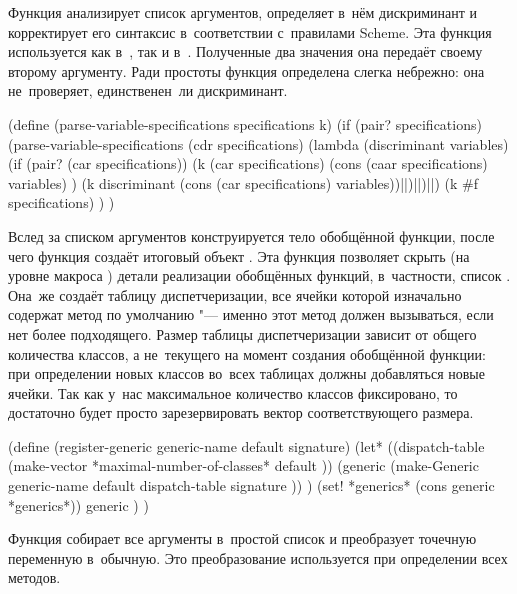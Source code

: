 Функция  анализирует список аргументов,
определяет в~нём дискриминант и корректирует его синтаксис в~соответствии
с~правилами Scheme. Эта функция используется как в~, так и
в~. Полученные два значения она передаёт своему второму
аргументу. Ради простоты функция  определена
слегка небрежно: она не~проверяет, единственен~ли дискриминант.

\begin{code:lisp}
(define (parse-variable-specifications specifications k)
  (if (pair? specifications)
      (parse-variable-specifications
       (cdr specifications)
       (lambda (discriminant variables)
         (if (pair? (car specifications))
             (k (car specifications)
                (cons (caar specifications) variables) )
             (k discriminant (cons (car specifications) variables))|\:|)|\:|)|\:|)
      (k #f specifications) ) )
\end{code:lisp}

Вслед за списком аргументов конструируется тело обобщённой функции, после чего
функция  создаёт итоговый объект {\Meroonet}. Эта функция
позволяет скрыть (на уровне макроса ) детали реализации
обобщённых функций, в~частности, список . Она~же создаёт таблицу
диспетчеризации, все ячейки которой изначально содержат метод по умолчанию "---
именно этот метод должен вызываться, если нет более подходящего. Размер таблицы
диспетчеризации зависит от общего количества классов, а не~текущего на момент
создания обобщённой функции: при определении новых классов во~всех таблицах
должны добавляться новые ячейки. Так как у~нас максимальное количество классов
фиксировано, то достаточно будет просто зарезервировать вектор соответствующего
размера.

\begin{code:lisp}
(define (register-generic generic-name default signature)
  (let* ((dispatch-table (make-vector *maximal-number-of-classes*
                                      default ))
         (generic (make-Generic generic-name
                                default
                                dispatch-table
                                signature )) )
    (set! *generics* (cons generic *generics*))
    generic ) )
\end{code:lisp}

Функция  собирает все аргументы в~простой список и
преобразует точечную переменную в~обычную. Это преобразование используется при
определении всех методов.

